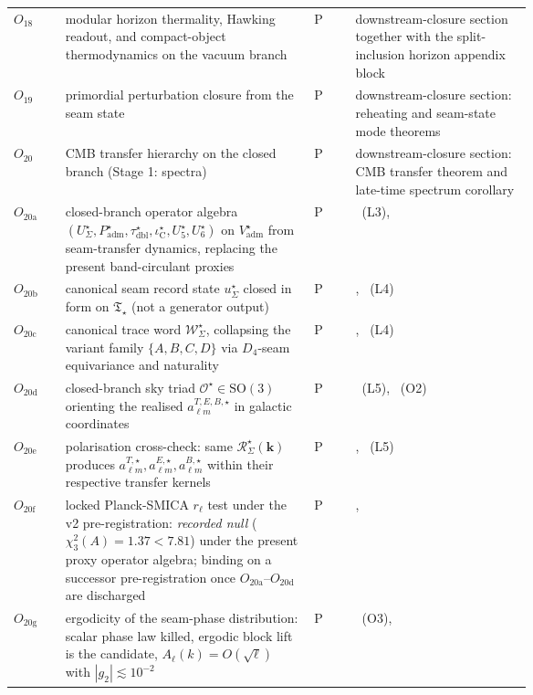 \documentclass[11pt,a4paper]{article}
\theoremstyle{definition}
\theoremstyle{remark}
\newcommand{\taudbl}{\tau_{\mathrm{dbl}}}
\newcommand{\iC}{\iota_{\mathrm C}}
\newcommand{\Padm}{P_{\mathrm{adm}}}
\newcommand{\Tstar}{\mathfrak T_{\star}}
\begin{document}
\begin{table}[p]
\begin{tabularx}{\linewidth}{@{}>{\raggedright\arraybackslash}p{0.10\linewidth}>{\raggedright\arraybackslash}p{0.48\linewidth}>{\centering\arraybackslash}p{0.08\linewidth}Y@{}}
$O_{18}$ & modular horizon thermality, Hawking readout, and compact-object thermodynamics on the vacuum branch & P & downstream-closure section together with the split-inclusion horizon appendix block \\
$O_{19}$ & primordial perturbation closure from the seam state & P & downstream-closure section: reheating and seam-state mode theorems \\
$O_{20}$ & CMB transfer hierarchy on the closed branch (Stage 1: spectra) & P & downstream-closure section: CMB transfer theorem and late-time spectrum corollary \\
$O_{20\mathrm{a}}$ & closed-branch operator algebra $(U_\Sigma^\star,\Padm^\star,\taudbl^\star,\iC^\star,U_5^\star,U_6^\star)$ on $V_{\mathrm{adm}}^\star$ from seam-transfer dynamics, replacing the present band-circulant proxies & P & ~(L3),  \\
$O_{20\mathrm{b}}$ & canonical seam record state $u_\Sigma^\star$ closed in form on $\Tstar$ (not a generator output) & P & , ~(L4) \\
$O_{20\mathrm{c}}$ & canonical trace word $\mathcal W_\Sigma^\star$, collapsing the variant family $\{A,B,C,D\}$ via $D_4$-seam equivariance and naturality & P & , ~(L4) \\
$O_{20\mathrm{d}}$ & closed-branch sky triad $\mathcal O^\star\in\mathrm{SO}(3)$ orienting the realised $a_{\ell m}^{T,E,B,\star}$ in galactic coordinates & P & ~(L5), ~(O2) \\
$O_{20\mathrm{e}}$ & polarisation cross-check: same $\mathcal R_\Sigma^\star(\mathbf k)$ produces $a_{\ell m}^{T,\star},a_{\ell m}^{E,\star},a_{\ell m}^{B,\star}$ within their respective transfer kernels & P & , ~(L5) \\
$O_{20\mathrm{f}}$ & locked Planck-SMICA $r_\ell$ test under the v2 pre-registration: \emph{recorded null} ($\chi_3^2(A)=1.37<7.81$) under the present proxy operator algebra; binding on a successor pre-registration once $O_{20\mathrm{a}}$--$O_{20\mathrm{d}}$ are discharged & P & ,  \\
$O_{20\mathrm{g}}$ & ergodicity of the seam-phase distribution: scalar phase law killed, ergodic block lift is the candidate, $A_\ell(k)=O(\sqrt{\ell})$ with $|g_2|\lesssim 10^{-2}$ & P & ~(O3),  \\

\end{tabularx}
\end{table}
\end{document}
